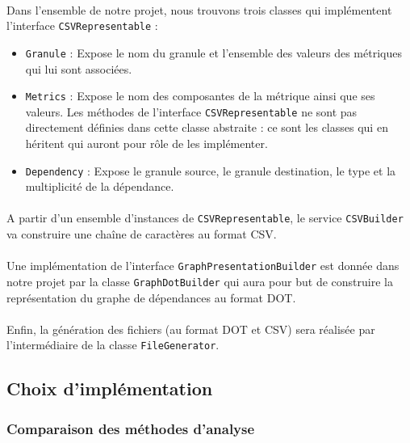 \documentclass{scrartcl}
\begin{document}
    \paragraph{}Dans l'ensemble de notre projet, nous trouvons trois classes qui implémentent l'interface \texttt{CSVRepresentable} :
    \begin{itemize}
        \item \texttt{Granule} : Expose le nom du granule et l'ensemble des valeurs des métriques qui lui sont associées. 
        \item \texttt{Metrics} : Expose le nom des composantes de la métrique ainsi que ses valeurs. Les méthodes de l'interface \texttt{CSVRepresentable} ne sont pas directement définies dans cette classe abstraite : ce sont les classes qui en héritent qui auront pour rôle de les implémenter.
        \item \texttt{Dependency} : Expose le granule source, le granule destination, le type et la multiplicité de la dépendance.
    \end{itemize}
    
    \paragraph{}A partir d'un ensemble d'instances de \texttt{CSVRepresentable}, le service \texttt{CSVBuilder} va construire une chaîne de caractères au format CSV. 
    
    \paragraph{}Une implémentation de l'interface \texttt{GraphPresentationBuilder} est donnée dans notre projet par la classe \texttt{GraphDotBuilder} qui aura pour but de construire la représentation du graphe de dépendances au format DOT.
    
    \paragraph{}Enfin, la génération des fichiers (au format DOT et CSV) sera réalisée par l'intermédiaire de la classe \texttt{FileGenerator}.

\subsection{Choix d'implémentation}

    \subsubsection{Comparaison des méthodes d'analyse}
    \label{methodsComparison}
\end{document}
